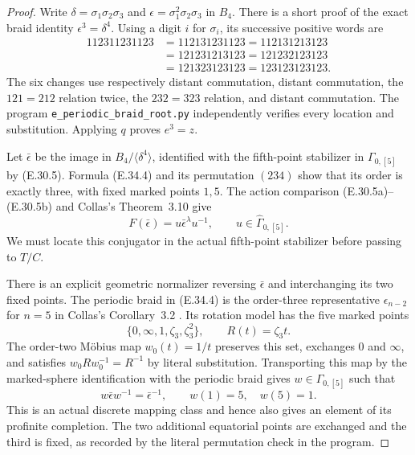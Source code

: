 \begin{proof}
Write
$\delta=\sigma_1\sigma_2\sigma_3$ and
$\epsilon=\sigma_1^2\sigma_2\sigma_3$ in $B_4$.
There is a short proof of the exact braid identity
$\epsilon^3=\delta^4$.  Using a digit $i$ for
$\sigma_i$, its successive positive words are
\[
\begin{aligned}
 112311231123&=112131231123=112131213123\\
             &=121231213123=121232123123\\
             &=121323123123=123123123123.
\end{aligned}
 \tag{E.34.4}
\]
The six changes use respectively distant commutation,
distant commutation, the $121=212$ relation twice,
the $232=323$ relation, and distant commutation.
The program \texttt{e\_periodic\_braid\_root.py}
independently verifies every location and substitution.
Applying $q$ proves $e^3=z$.

Let $\bar\epsilon$ be the image in
$B_4/\langle\delta^4\rangle$, identified with the
fifth-point stabilizer in $\Gamma_{0,[5]}$ by
\textup{(E.30.5)}.  Formula \textup{(E.34.4)} and
its permutation $(234)$ show that its order is
exactly three, with fixed marked points $1,5$.
The action comparison \textup{(E.30.5a)--(E.30.5b)}
and Collas's Theorem~3.10 give
\[
 F(\bar\epsilon)=u\bar\epsilon^\lambda u^{-1},
                   \qquad u\in\widehat\Gamma_{0,[5]}.
 \tag{E.34.5}
\]
We must locate this conjugator in the actual
fifth-point stabilizer before passing to $T/C$.

There is an explicit geometric normalizer reversing
$\bar\epsilon$ and interchanging its two fixed
points.  The periodic braid in
\textup{(E.34.4)} is the order-three representative
$\epsilon_{n-2}$ for $n=5$ in Collas's
Corollary~3.2 \cite{ERootCollas2012}.
Its rotation model has the five marked points
\[
                    \{0,\infty,1,\zeta_3,\zeta_3^2\},
 \qquad R(t)=\zeta_3t.
 \tag{E.34.6}
\]
The order-two Möbius map $w_0(t)=1/t$ preserves
this set, exchanges $0$ and $\infty$, and satisfies
$w_0Rw_0^{-1}=R^{-1}$ by literal substitution.
Transporting this map by the marked-sphere
identification with the periodic braid gives
$w\in\Gamma_{0,[5]}$ such that
\[
 w\bar\epsilon w^{-1}=\bar\epsilon^{-1},
                 \qquad w(1)=5,\quad w(5)=1.
 \tag{E.34.7}
\]
This is an actual discrete mapping class and hence
also gives an element of its profinite completion.
The two additional equatorial points are exchanged
and the third is fixed, as recorded by the literal
permutation check in the program.


\end{proof}
